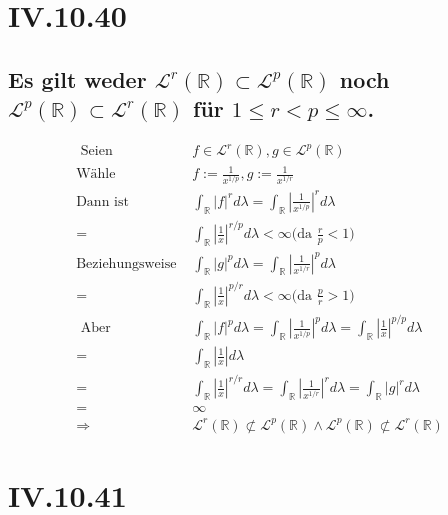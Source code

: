 \documentclass[12pt,a4paper]{article}
\begin{document}
\section*{IV.10.40}
\subsection*{Es gilt weder $\mathscr{L}^r(\mathbb{R}) \subset \mathscr{L}^p(\mathbb{R})$ noch $\mathscr{L}^p(\mathbb{R}) \subset \mathscr{L}^r(\mathbb{R})$ für $1 \leq r < p \leq \infty$. }
\begin{align*}
	\text{ Seien } &f \in \mathscr{L}^r(\mathbb{R}), g \in \mathscr{L}^p(\mathbb{R})\\
	\text{Wähle } & f := \frac{1}{x^{1/p}}, g:= \frac{1}{x^{1/r}}\\
	\text{Dann ist } & \int_\mathbb{R}|f|^r d\lambda = \int_\mathbb{R}\left\lvert\frac{1}{x^{1/p}}\right\lvert^r d\lambda \\
	= & \int_\mathbb{R}\left\lvert \frac{1}{x}\right\lvert^{r/p} d\lambda < \infty\bigg(\text{da } \frac{r}{p}<1\bigg)\\
	\text{Beziehungsweise } & \int_\mathbb{R}|g|^p d\lambda = \int_\mathbb{R}\left\lvert\frac{1}{x^{1/r}}\right\lvert^p d\lambda \\
	= & \int_\mathbb{R}\left\lvert \frac{1}{x}\right\lvert^{p/r} d\lambda < \infty\bigg(\text{da } \frac{p}{r}>1\bigg)\\
	\text{ Aber } & \int_\mathbb{R}|f|^p d\lambda =\int_\mathbb{R}\left\lvert\frac{1}{x^{1/p}}\right\lvert^p d\lambda= \int_\mathbb{R}\left\lvert \frac{1}{x}\right\lvert^{p/p} d\lambda \\	
	= & \int_\mathbb{R}\left\lvert \frac{1}{x}\right\lvert d\lambda \\
	= & \int_\mathbb{R}\left\lvert \frac{1}{x}\right\lvert^{r/r} d\lambda = \int_\mathbb{R}\left\lvert\frac{1}{x^{1/r}}\right\lvert^r d\lambda  = \int_\mathbb{R}|g|^r d\lambda \\
	= & \infty\\
	\Rightarrow & \mathscr{L}^r(\mathbb{R}) \not\subset \mathscr{L}^p(\mathbb{R}) \land\mathscr{L}^p(\mathbb{R}) \not\subset \mathscr{L}^r(\mathbb{R})
\end{align*}


\section*{IV.10.41}
\end{document}
